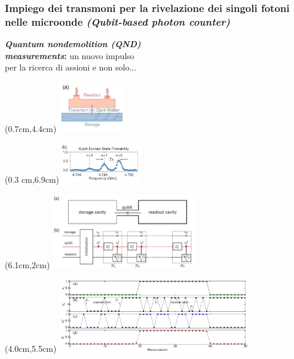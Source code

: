 \documentclass[10pt]{beamer}
\begin{document}
\begin{frame}[t]
\frametitle{Impiego dei transmoni per la rivelazione dei singoli fotoni nelle microonde \textit{(Qubit-based photon counter)} }


\textbf{\textit{Quantum nondemolition (QND)\\ measurements}:} un nuovo impulso\\ per la ricerca di assioni e non solo...



\begin{textblock*}{4.5cm}(0.7cm,4.4cm) %
\includegraphics[width=2.8cm]{img5/qubit_freq_a.jpg}
\end{textblock*}


\begin{textblock*}{4.5cm}(0.3 cm,6.9cm) %
\includegraphics[width=3.5cm]{img5/qubit_freq_b.jpg}
\end{textblock*}

\begin{textblock*}{6.5cm}(6.1cm,2cm) %
\includegraphics[width=6.3cm]{img5/cavity.JPG}
\end{textblock*}


\begin{textblock*}{10cm}(4.0cm,5.5cm) 
\includegraphics[width=8.4cm]{img5/measures.JPG}
\end{textblock*}

\end{frame}
\end{document}
